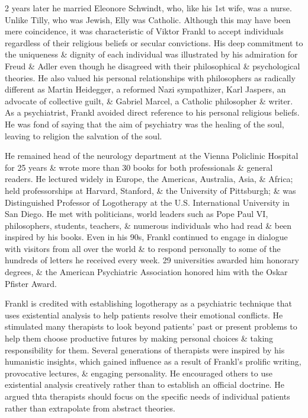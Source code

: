 \documentclass{article}
\numberwithin{equation}{section}
\begin{document}
2 years later he married Eleonore Schwindt, who, like his 1st wife, was a nurse. Unlike Tilly, who was Jewish, Elly was Catholic. Although this may have been mere coincidence, it was characteristic of Viktor Frankl to accept individuals regardless of their religious beliefs or secular convictions. His deep commitment to the uniqueness \& dignity of each individual was illustrated by his admiration for Freud \& Adler even though he disagreed with their philosophical \& psychological theories. He also valued his personal relationships with philosophers as radically different as Martin Heidegger, a reformed Nazi sympathizer, Karl Jaspers, an advocate of collective guilt, \& Gabriel Marcel, a Catholic philosopher \& writer. As a psychiatrist, Frankl avoided direct reference to his personal religious beliefs. He was fond of saying that the aim of psychiatry was the healing of the soul, leaving to religion the salvation of the soul.

He remained head of the neurology department at the Vienna Policlinic Hospital for 25 years \& wrote more than 30 books for both professionals \& general readers. He lectured widely in Europe, the Americas, Australia, Asia, \& Africa; held professorships at Harvard, Stanford, \& the University of Pittsburgh; \& was Distinguished Professor of Logotherapy at the U.S. International University in San Diego. He met with politicians, world leaders such as Pope Paul VI, philosophers, students, teachers, \& numerous individuals who had read \& been inspired by his books. Even in his 90s, Frankl continued to engage in dialogue with visitors from all over the world \& to respond personally to some of the hundreds of letters he received every week. 29 universities awarded him honorary degrees, \& the American Psychiatric Association honored him with the Oskar Pfister Award.

Frankl is credited with establishing logotherapy as a psychiatric technique that uses existential analysis to help patients resolve their emotional conflicts. He stimulated many therapists to look beyond patients' past or present problems to help them choose productive futures by making personal choices \& taking responsibility for them. Several generations of therapists were inspired by his humanistic insights, which gained influence as a result of Frankl's prolific writing, provocative lectures, \& engaging personality. He encouraged others to use existential analysis creatively rather than to establish an official doctrine. He argued thta therapists should focus on the specific needs of individual patients rather than extrapolate from abstract theories.
\end{document}
